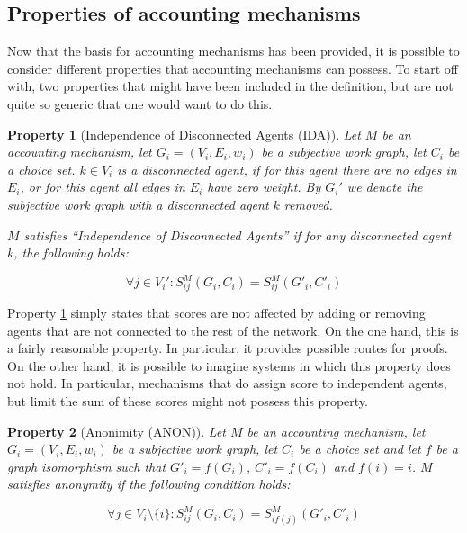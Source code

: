 \documentclass[a4paper,11pt]{book}
\newtheorem{property}{Property}
\theoremstyle{definition}
\begin{document}
\subsection{Properties of accounting mechanisms}

Now that the basis for accounting mechanisms has been provided, it is possible to consider different
properties that accounting mechanisms can possess. To start off with, two properties that might have
been included in the definition, but are not quite so generic that one would want to do this.

\begin{property}[Independence of Disconnected Agents (IDA)]
    Let $M$ be an accounting mechanism, let $G_i = (V_i, E_i, w_i)$ be a subjective work graph, let 
    $C_i$ be a choice set. $k \in V_i$ is a disconnected agent, if for this agent there are no edges
    in $E_i$, or for this agent all edges in $E_i$ have zero weight. By $G_i'$ we denote the subjective
    work graph with a disconnected agent $k$ removed.

    $M$ satisfies ``Independence of Disconnected Agents'' if for any disconnected agent $k$, the following
    holds:

    \begin{equation*}
        \forall j \in V_i' : S_{ij}^M(G_i, C_i) = S_{ij}^M(G'_i, C'_i)
    \end{equation*}
    \label{prop:ida}
\end{property}

Property \ref{prop:ida} simply states that scores are not affected by adding or removing agents
that are not connected to the rest of the network. On the one hand, this is a fairly reasonable property.
In particular, it provides possible routes for proofs. On the other hand, it is possible to imagine systems
in which this property does not hold. In particular, mechanisms that do assign score to independent agents,
but limit the sum of these scores might not possess this property.


\begin{property}[Anonimity (ANON)]
    Let $M$ be an accounting mechanism, let $G_i = (V_i, E_i, w_i)$ be a subjective work graph, let 
    $C_i$ be a choice set and let $f$ be a graph isomorphism such that $G'_i = f(G_i)$, $C'_i = f(C_i)$
    and $f(i) = i$. $M$ satisfies anonymity if the following condition holds:

    \begin{equation*}
        \forall j \in V_i \setminus \{i\} : S_{ij}^M(G_i, C_i) = S_{if(j)}^M(G'_i, C'_i)
    \end{equation*}
    \label{prop:anon}
\end{property}
\end{document}
